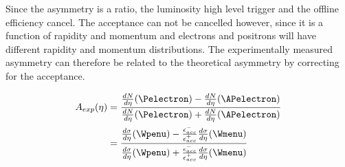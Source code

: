 Since the asymmetry is a ratio, the luminosity high level trigger and the
offline efficiency cancel.\cite{me} The acceptance can not be cancelled
however, since it is a function of rapidity and momentum and electrons and
positrons will have different rapidity and momentum distributions. The
experimentally measured asymmetry can therefore be related to the theoretical
asymmetry by correcting for the acceptance.\cite{me}

\begin{align} 
A_{exp}(\eta) &= \frac{ \frac{dN}{d\eta}(\Pelectron) -
\frac{dN}{d\eta}(\APelectron) }{ \frac{dN}{d\eta}(\Pelectron) +
\frac{dN}{d\eta}(\APelectron) }\\   
              &= \frac{ \frac{d\sigma}{d\eta}(\Wpenu) -
\frac{\epsilon^{-}_{acc}}{\epsilon^{+}_{acc}} \frac{d\sigma}{d\eta}(\Wmenu) }{
\frac{d\sigma}{d\eta}(\Wpenu) + \frac{\epsilon^{-}_{acc}}{\epsilon^{+}_{acc}}
\frac{d\sigma}{d\eta}(\Wmenu) }
\label{eq:AsymExpCorr}
\end{align}

